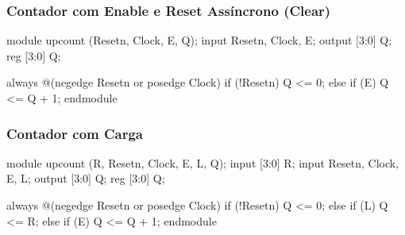 
\begin{frame}[fragile]
	\frametitle{Contador com Enable e Reset Assíncrono (Clear)}
	\begin{verilogcode}
module upcount (Resetn, Clock, E, Q); 
  input Resetn, Clock, E;
  output [3:0] Q;
  reg [3:0] Q;

  always @(negedge Resetn or posedge Clock) 
    if (!Resetn)
      Q <= 0; 
    else if (E)
      Q <= Q + 1; 
endmodule
	\end{verilogcode}
\end{frame}

\begin{frame}[fragile]
	\frametitle{Contador com Carga}
	\begin{verilogcode}
module upcount (R, Resetn, Clock, E, L, Q); 
  input [3:0] R;
  input Resetn, Clock, E, L;
  output [3:0] Q;
  reg [3:0] Q;

  always @(negedge Resetn or posedge Clock) 
    if (!Resetn)
      Q <= 0; 
    else if (L)
      Q <= R; 
    else if (E)
      Q <= Q + 1; 
endmodule
	\end{verilogcode}
\end{frame}

